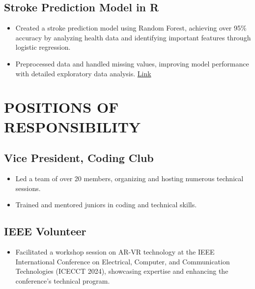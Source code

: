 \documentclass[a4paper,11pt]{article}
\begin{document}
\subsection{Stroke Prediction Model in R} 
\begin{itemize}
    \item Created a stroke prediction model using Random Forest, achieving over 95\% accuracy by analyzing health data and identifying important features through logistic regression.
    \item Preprocessed data and handled missing values, improving model performance with detailed exploratory data analysis. \href{https://github.com/anoushkaacc/R-for-Data-Science}{Link} 
\end{itemize}

\section*{POSITIONS OF RESPONSIBILITY}

\subsection*{Vice President, Coding Club}
\begin{itemize}
    \item Led a team of over 20 members, organizing and hosting numerous technical sessions.
    \item Trained and mentored juniors in coding and technical skills.
\end{itemize}

\subsection*{IEEE Volunteer}
\begin{itemize}
    \item Facilitated a workshop session on AR-VR technology at the IEEE International Conference on Electrical, Computer, and Communication Technologies (ICECCT 2024), showcasing expertise and enhancing the conference's technical program.
\end{itemize}
\end{document}
